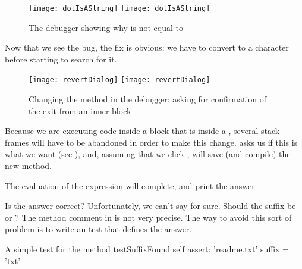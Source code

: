 \documentclass[a4paper,10pt,twoside]{book}
\begin{document}
\begin{figure}[btp]
	\begin{center}
	\ifluluelse
		{\texttt{[image: dotIsAString]}}
		{\texttt{[image: dotIsAString]}}
	\end{center}
	\caption{The debugger showing why  is not equal to }
\end{figure}

Now that we see the bug, the fix is obvious: we have to convert  to a character before starting to search for it.  

\begin{figure}[btp]
	\begin{center}
	\ifluluelse
		{\texttt{[image: revertDialog]}}
		{\texttt{[image: revertDialog]}}
	\end{center}
	\caption{Changing the  method in the debugger: asking for confirmation of the exit from an inner block}
\end{figure}


Because we are executing code inside a block that is inside a , several stack frames will have to be abandoned in order to make this change.  \pharo asks us if this is what we want (see ), and, assuming that we click , will save (and compile) the new method.


The evaluation of the expression  will complete, and print the answer .

Is the answer correct?  Unfortunately, we can't say for sure.  Should the suffix be  or ?
The method comment in  is not very precise.  
The way to avoid this sort of problem is to write an  test that defines the answer.

\begin{method}[testSuffix]{A simple test for the  method}
testSuffixFound
	self assert: 'readme.txt' suffix = 'txt'
\end{method}
\end{document}

